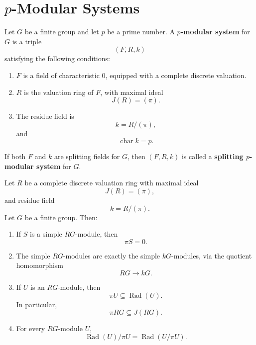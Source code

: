 \section{\texorpdfstring{\(p\)-Modular Systems}{p-Modular Systems}}

\begin{definition}
    Let \(G\) be a finite group and let \(p\) be a prime number. A
    \textbf{\(p\)-modular system} for \(G\) is a triple
    \[
        (F,R,k)
    \]
    satisfying the following conditions:
    \begin{enumerate}
        \item \(F\) is a field of characteristic \(0\), equipped with a complete
        discrete valuation.
        \item \(R\) is the valuation ring of \(F\), with maximal ideal
        \[
            J(R)=(\pi).
        \]
        \item The residue field is
        \[
            k=R/(\pi),
        \]
        and
        \[
            \operatorname{char} k=p.
        \]
    \end{enumerate}
    If both \(F\) and \(k\) are splitting fields for \(G\), then \((F,R,k)\) is called
    a \textbf{splitting \(p\)-modular system} for \(G\).
\end{definition}

\begin{lemma}
    Let \(R\) be a complete discrete valuation ring with maximal ideal
    \[
        J(R)=(\pi),
    \]
    and residue field
    \[
        k=R/(\pi).
    \]
    Let \(G\) be a finite group. Then:
    \begin{enumerate}
        \item If \(S\) is a simple \(RG\)-module, then
        \[
            \pi S=0.
        \]

        \item The simple \(RG\)-modules are exactly the simple \(kG\)-modules,
        via the quotient homomorphism
        \[
            RG\longrightarrow kG.
        \]

        \item If \(U\) is an \(RG\)-module, then
        \[
            \pi U\subseteq \operatorname{Rad}(U).
        \]
        In particular,
        \[
            \pi RG\subseteq J(RG).
        \]

        \item For every \(RG\)-module \(U\),
        \[
            \operatorname{Rad}(U)/\pi U
            =
            \operatorname{Rad}(U/\pi U).
        \]
    \end{enumerate}
\end{lemma}

